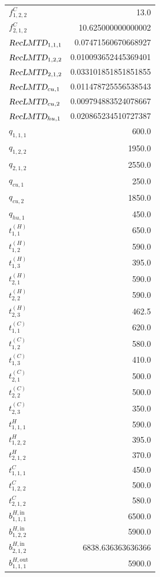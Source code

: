 \documentclass{article}%
\begin{document}
\begin{multicols*}{3}
\begin{supertabular}{lr}
	$f_{1,2,2}^{C}$ & 13.0 \\%
	$f_{2,1,2}^{C}$ & 10.625000000000002 \\%
	$\textsl{RecLMTD}_{1,1,1}$ & 0.07471560670668927 \\%
	$\textsl{RecLMTD}_{1,2,2}$ & 0.010093652445369401 \\%
	$\textsl{RecLMTD}_{2,1,2}$ & 0.033101851851851855 \\%
	$\textsl{RecLMTD}_{cu,1}$ & 0.011478725556538543 \\%
	$\textsl{RecLMTD}_{cu,2}$ & 0.009794883524078667 \\%
	$\textsl{RecLMTD}_{hu,1}$ & 0.020865234510727387 \\%
	$q_{1,1,1}$ & 600.0 \\%
	$q_{1,2,2}$ & 1950.0 \\%
	$q_{2,1,2}$ & 2550.0 \\%
	$q_{cu,1}$ & 250.0 \\%
	$q_{cu,2}$ & 1850.0 \\%
	$q_{hu,1}$ & 450.0 \\%
	$t_{1,1}^{(H)}$ & 650.0 \\%
	$t_{1,2}^{(H)}$ & 590.0 \\%
	$t_{1,3}^{(H)}$ & 395.0 \\%
	$t_{2,1}^{(H)}$ & 590.0 \\%
	$t_{2,2}^{(H)}$ & 590.0 \\%
	$t_{2,3}^{(H)}$ & 462.5 \\%
	$t_{1,1}^{(C)}$ & 620.0 \\%
	$t_{1,2}^{(C)}$ & 580.0 \\%
	$t_{1,3}^{(C)}$ & 410.0 \\%
	$t_{2,1}^{(C)}$ & 500.0 \\%
	$t_{2,2}^{(C)}$ & 500.0 \\%
	$t_{2,3}^{(C)}$ & 350.0 \\%
	$t_{1,1,1}^{H}$ & 590.0 \\%
	$t_{1,2,2}^{H}$ & 395.0 \\%
	$t_{2,1,2}^{H}$ & 370.0 \\%
	$t_{1,1,1}^{C}$ & 450.0 \\%
	$t_{1,2,2}^{C}$ & 500.0 \\%
	$t_{2,1,2}^{C}$ & 580.0 \\%
	$b_{1,1,1}^{H,\text{in}}$ & 6500.0 \\%
	$b_{1,2,2}^{H,\text{in}}$ & 5900.0 \\%
	$b_{2,1,2}^{H,\text{in}}$ & 6838.636363636366 \\%
	$b_{1,1,1}^{H,\text{out}}$ & 5900.0 \\%

\end{supertabular}
\end{multicols*}
\end{document}
